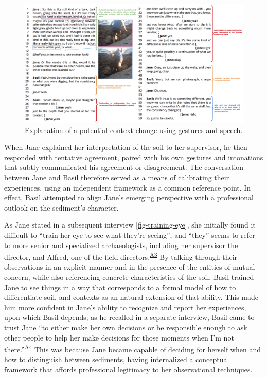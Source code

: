 \documentclass{article}
\begin{document}
\begin{figure}
\centering
\includegraphics[width=6in]{../figures/context-change-discussion.png}
\caption{Explanation of a potential context change using gestures and
speech.}\label{fig-context-change-discussion}
\end{figure}

When Jane explained her interpretation of the soil to her supervisor, he
then responded with tentative agreement, paired with his own gestures
and intonations that subtly communicated his agreement or disagreement.
The conversation between Jane and Basil therefore served as a means of
calibrating their experiences, using an independent framework as a
common reference point. In effect, Basil attempted to align Jane's
emerging perspective with a professional outlook on the sediment's
character.

As Jane stated in a subsequent interview \autoref{fig-training-eye},
she initially found it difficult to ``train her eye to see what they're
seeing'', and ``they'' seems to refer to more senior and specialized
archaeologists, including her supervisor the director, and Alfred, one
of the field directors.\textsuperscript{\hyperref[sec-A3]{A3}} By
talking through their observations in an explicit manner and in the
presence of the entities of mutual concern, while also referencing
concrete characteristics of the soil, Basil trained Jane to see things
in a way that corresponds to a formal model of how to differentiate
soil, and contexts as an natural extension of that ability. This made
him more confident in Jane's ability to recognize and report her
experiences, upon which Basil depends; as he recalled in a separate
interview, Basil came to trust Jane ``to either make her own decisions
or be responsible enough to ask other people to help her make decisions
for those moments when I'm not
there.''\textsuperscript{\hyperref[sec-A4]{A4}} This was because Jane
became capable of deciding for herself when and how to distinguish
between sediments, having internalized a conceptual framework that
affords professional legitimacy to her observational techniques.
\end{document}
